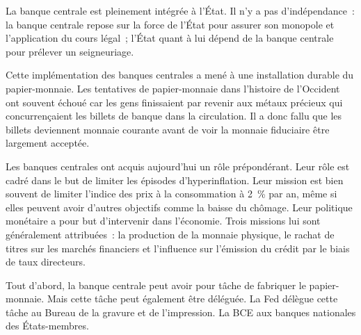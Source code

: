 La banque centrale est pleinement intégrée à l'État. Il n'y a pas d'indépendance~: la banque centrale repose sur la force de l'État pour assurer son monopole et l'application du cours légal~; l'État quant à lui dépend de la banque centrale pour prélever un seigneuriage.

Cette implémentation des banques centrales a mené à une installation durable du papier-monnaie. Les tentatives de papier-monnaie dans l'histoire de l'Occident ont souvent échoué car les gens finissaient par revenir aux métaux précieux qui concurrençaient les billets de banque dans la circulation. Il a donc fallu que les billets deviennent monnaie courante avant de voir la monnaie fiduciaire être largement acceptée.


Les banques centrales ont acquis aujourd'hui un rôle prépondérant. Leur rôle est cadré dans le but de limiter les épisodes d'hyperinflation. Leur mission est bien souvent de limiter l'indice des prix à la consommation à 2~\% par an, même si elles peuvent avoir d'autres objectifs comme la baisse du chômage. Leur politique monétaire a pour but d'intervenir dans l'économie. Trois missions lui sont généralement attribuées~: la production de la monnaie physique, le rachat de titres sur les marchés financiers et l'influence sur l'émission du crédit par le biais de taux directeurs.

Tout d'abord, la banque centrale peut avoir pour tâche de fabriquer le papier-monnaie. Mais cette tâche peut également être déléguée. La Fed délègue cette tâche au Bureau de la gravure et de l'impression. La BCE aux banques nationales des États-membres.


